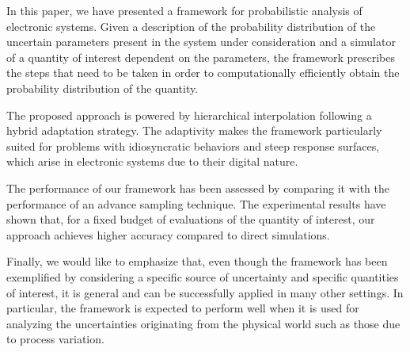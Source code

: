 In this paper, we have presented a framework for probabilistic analysis of
electronic systems. Given a description of the probability distribution of the
uncertain parameters present in the system under consideration and a simulator
of a quantity of interest dependent on the parameters, the framework prescribes
the steps that need to be taken in order to computationally efficiently obtain
the probability distribution of the quantity.

The proposed approach is powered by hierarchical interpolation following a
hybrid adaptation strategy. The adaptivity makes the framework particularly
suited for problems with idiosyncratic behaviors and steep response surfaces,
which arise in electronic systems due to their digital nature.

The performance of our framework has been assessed by comparing it with the
performance of an advance sampling technique. The experimental results have
shown that, for a fixed budget of evaluations of the quantity of interest, our
approach achieves higher accuracy compared to direct simulations.

Finally, we would like to emphasize that, even though the framework has been
exemplified by considering a specific source of uncertainty and specific
quantities of interest, it is general and can be successfully applied in many
other settings. In particular, the framework is expected to perform well when it
is used for analyzing the uncertainties originating from the physical world such
as those due to process variation.

